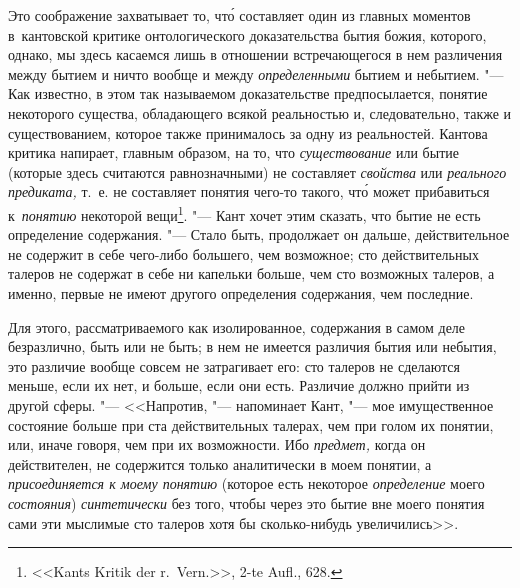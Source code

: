 Это соображение захватывает то, чт\'{о} составляет один из главных моментов
в~кантовской критике онтологического доказательства бытия божия, которого,
однако, мы здесь касаемся лишь в отношении встречающегося в нем различения
между бытием и ничто вообще и между {\em определенными} бытием и небытием. "---
Как известно, в этом так называемом доказательстве предпосылается, понятие
некоторого существа, обладающего всякой реальностью и, следовательно, также и
существованием, которое также принималось за одну из реальностей. Кантова
критика напирает, главным образом, на то, что {\em существование} или бытие
(которые здесь считаются равнозначными) не составляет {\em свойства} или {\em
реального предиката,} т.~е. не составляет понятия чего-то такого, чт\'{о} может
прибавиться к~{\em понятию} некоторой вещи\footnote{<<Kants Kritik der
r.~Vern.>>, 2-te Aufl., 628.}. "--- Кант хочет этим сказать, что бытие не есть
определение содержания. "--- Стало быть, продолжает он дальше, действительное
не содержит в себе чего-либо большего, чем возможное; сто действительных
талеров не содержат в себе ни капельки больше, чем сто возможных талеров, а
именно, первые не имеют другого определения содержания, чем последние.

Для этого, рассматриваемого как изолированное, содержания в самом деле
безразлично, быть или не быть; в нем не имеется различия бытия или небытия, это
различие вообще совсем не затрагивает его: сто талеров не сделаются меньше,
если их нет, и больше, если они есть. Различие должно прийти из другой сферы.
"--- <<Напротив, "--- напоминает Кант, "--- мое имущественное состояние больше
при ста действительных талерах, чем при голом их понятии, или, иначе говоря,
чем при их возможности. Ибо {\em предмет,} когда он действителен, не содержится
только аналитически в моем понятии, а {\em присоединяется к моему понятию}
(которое есть некоторое {\em определение} моего {\em состояния})
{\em синтетически} без того, чтобы через это бытие вне моего понятия сами эти
мыслимые сто талеров хотя бы сколько-нибудь увеличились>>.

